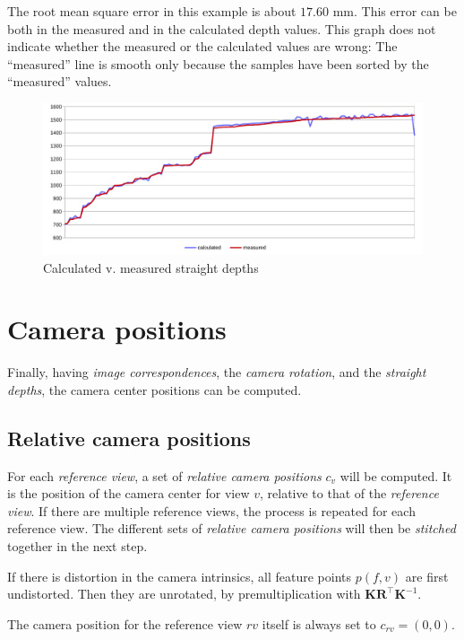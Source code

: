 \documentclass[11pt]{scrreprt}
\newcommand{\matr}[1]{\mathbf{#1}}
\newcommand{\transpose}[1]{#1^\intercal}
\begin{document}
The root mean square error in this example is about $17.60 \text{ mm}$. This error can be both in the measured and in the calculated depth values. This graph does not indicate whether the measured or the calculated values are wrong: The ``measured'' line is smooth only because the samples have been sorted by the ``measured'' values.

\begin{figure}
\centering
\includegraphics[width=\textwidth]{depthcmp.pdf}
\caption{Calculated v. measured straight depths}
\label{fig:depthcomp}
\end{figure}


\pagebreak
\section{Camera positions}
\label{sec:campos}
Finally, having \emph{image correspondences}, the \emph{camera rotation}, and the \emph{straight depths}, the camera center positions can be computed.

\subsection{Relative camera positions}
For each \emph{reference view}, a set of \emph{relative camera positions} $c_v$ will be computed. It is the position of the camera center for view $v$, relative to that of the \emph{reference view}. If there are multiple reference views, the process is repeated for each reference view. The different sets of \emph{relative camera positions} will then be \emph{stitched} together in the next step.

If there is distortion in the camera intrinsics, all feature points $p(f,v)$ are first undistorted. Then they are unrotated, by premultiplication with $\matr{K} \transpose{\matr{R}} \matr{K}^{-1}$.

The camera position for the reference view $rv$ itself is always set to $c_{rv} = (0, 0)$. 
\end{document}
